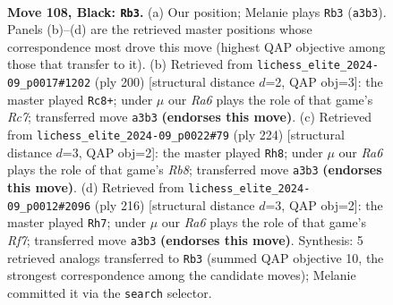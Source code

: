 \documentclass[11pt]{article}
\begin{document}
\clearpage

\begin{figure}[p]\centering
\begin{subfigure}{0.46\textwidth}\centering
\resizebox{\linewidth}{!}{%
\newchessgame
\chessboard[
  setfen={8/5k2/8/8/8/r7/3R1K2/7r b - - 27 108},
  showmover=false,
  pgfstyle=straightmove, color=movearrow, markmove={a3-b3}
]}
\caption{}
\end{subfigure}\hfill
\begin{subfigure}{0.46\textwidth}\centering
\resizebox{\linewidth}{!}{%
\newchessgame
\chessboard[
  setfen={5k1r/2R5/8/5K2/8/8/8/8 w - - 0 101},
  showmover=false,
  pgfstyle=straightmove, color=movearrow, markmove={c7-c8}
]}
\caption{}
\end{subfigure}
\\[4pt]
\begin{subfigure}{0.46\textwidth}\centering
\resizebox{\linewidth}{!}{%
\newchessgame
\chessboard[
  setfen={1R6/8/3K4/8/8/8/8/k1r5 w - - 94 113},
  showmover=false,
  pgfstyle=straightmove, color=movearrow, markmove={b8-h8}
]}
\caption{}
\end{subfigure}\hfill
\begin{subfigure}{0.46\textwidth}\centering
\resizebox{\linewidth}{!}{%
\newchessgame
\chessboard[
  setfen={2k5/5R2/8/2r5/8/8/3K4/8 w - - 95 109},
  showmover=false,
  pgfstyle=straightmove, color=movearrow, markmove={f7-h7}
]}
\caption{}
\end{subfigure}
\caption{\textbf{Move 108, Black: \texttt{Rb3}.} (a) Our position; Melanie plays \texttt{Rb3} (\texttt{a3b3}). Panels (b)--(d) are the retrieved master positions whose correspondence most drove this move (highest QAP objective among those that transfer to it). (b) Retrieved from \texttt{lichess\_elite\_2024-09\_p0017\#1202} (ply 200) [structural distance $d$=2, QAP obj=3]: the master played \texttt{Rc8+}; under $\mu$ our \emph{Ra6} plays the role of that game's \emph{Rc7}; transferred move \texttt{a3b3} \textbf{(endorses this move)}. (c) Retrieved from \texttt{lichess\_elite\_2024-09\_p0022\#79} (ply 224) [structural distance $d$=3, QAP obj=2]: the master played \texttt{Rh8}; under $\mu$ our \emph{Ra6} plays the role of that game's \emph{Rb8}; transferred move \texttt{a3b3} \textbf{(endorses this move)}. (d) Retrieved from \texttt{lichess\_elite\_2024-09\_p0012\#2096} (ply 216) [structural distance $d$=3, QAP obj=2]: the master played \texttt{Rh7}; under $\mu$ our \emph{Ra6} plays the role of that game's \emph{Rf7}; transferred move \texttt{a3b3} \textbf{(endorses this move)}. Synthesis: 5 retrieved analogs transferred to \texttt{Rb3} (summed QAP objective 10, the strongest correspondence among the candidate moves); Melanie committed it via the \texttt{search} selector.}
\label{fig:thought-m215}
\end{figure}
\end{document}
